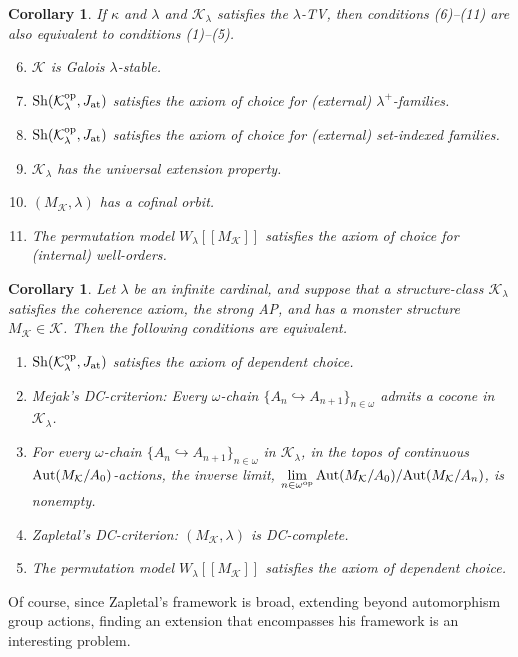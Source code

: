 \documentclass[10pt]{amsart}
\numberwithin{equation}{section}
\theoremstyle{plain}
\newtheorem{cor}[theorem]{Corollary}
\theoremstyle{definition}
\newcommand{\om}{\omega}
\newcommand{\K}{\mathcal{K}}
\newcommand{\embed}{\hookrightarrow}
\begin{document}
\begin{cor}
If $\kappa$ and $\lambda$ and $\K_\lambda$ satisfies the $\lambda$-TV, then conditions (6)--(11) are also equivalent to conditions (1)--(5).
\begin{enumerate}\setcounter{enumi}{5}
\item $\K$ is Galois $\lambda$-stable.
\item ${\rm Sh}(\K_\lambda^{\rm op},J_{\rm at})$ satisfies the axiom of choice for (external) $\lambda^+$-families.
\item ${\rm Sh}(\K_\lambda^{\rm op},J_{\rm at})$ satisfies the axiom of choice for (external) set-indexed families.
\item $\K_\lambda$ has the universal extension property.
\item $(M_\K,\lambda)$ has a cofinal orbit.
\item The permutation model $W_\lambda[[M_\K]]$ satisfies the axiom of choice for (internal) well-orders.
\end{enumerate}
\end{cor}

\begin{cor}\label{cor:DC-criterion-main}
Let $\lambda$ be an infinite cardinal, and suppose that a structure-class $\K_\lambda$ satisfies the coherence axiom, the strong AP, and has a monster structure $M_\K\in\K$.
Then the following conditions are equivalent.
\begin{enumerate}
\item ${\rm Sh}(\K_\lambda^{\rm op},J_{\rm at})$ satisfies the axiom of dependent choice.
\item Mejak's DC-criterion: Every $\om$-chain $\{A_n\embed A_{n+1}\}_{n\in\om}$ admits a cocone in $\K_\lambda$. 
\item For every $\om$-chain $\{A_n\embed A_{n+1}\}_{n\in\om}$ in $\K_\lambda$, in the topos of continuous ${\rm Aut}(M_\K/A_0)$-actions, the inverse limit, 
$\displaystyle{\lim_{n\in\om^{\rm op}}{\rm Aut}(M_\K/A_0)/{\rm Aut}(M_\K/A_n)}$, is nonempty.
\item Zapletal's DC-criterion: $(M_\K,\lambda)$ is DC-complete.
\item The permutation model $W_\lambda[[M_\K]]$ satisfies the axiom of dependent choice.
\end{enumerate}
\end{cor}

Of course, since Zapletal's framework \cite{Zap26} is broad, extending beyond automorphism group actions, finding an extension that encompasses his framework is an interesting problem.
\end{document}
